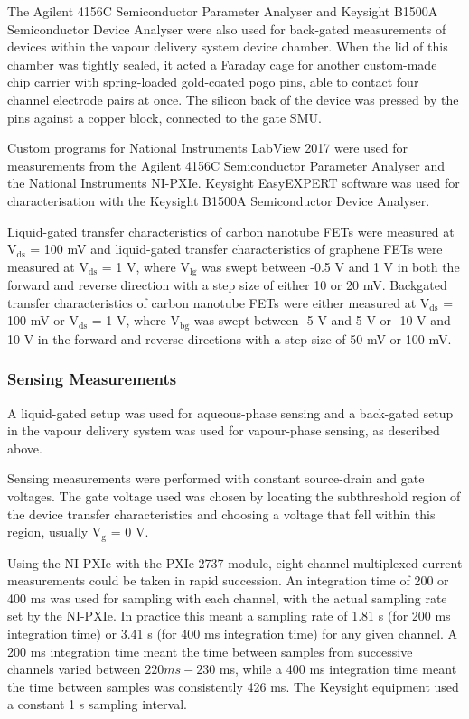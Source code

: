 \documentclass[
  letterpaper,
  DIV=11,
  numbers=noendperiod]{scrartcl}
\begin{document}
The Agilent 4156C Semiconductor Parameter Analyser and Keysight B1500A
Semiconductor Device Analyser were also used for back-gated measurements
of devices within the vapour delivery system device chamber. When the
lid of this chamber was tightly sealed, it acted a Faraday cage for
another custom-made chip carrier with spring-loaded gold-coated pogo
pins, able to contact four channel electrode pairs at once. The silicon
back of the device was pressed by the pins against a copper block,
connected to the gate SMU.

Custom programs for National Instruments LabView 2017 were used for
measurements from the Agilent 4156C Semiconductor Parameter Analyser and
the National Instruments NI-PXIe. Keysight EasyEXPERT software was used
for characterisation with the Keysight B1500A Semiconductor Device
Analyser.

Liquid-gated transfer characteristics of carbon nanotube FETs were
measured at V\(_{\mathrm{ds}}\) = 100 mV and liquid-gated transfer
characteristics of graphene FETs were measured at V\(_{\mathrm{ds}}\) =
1 V, where V\(_{\mathrm{lg}}\) was swept between -0.5 V and 1 V in both
the forward and reverse direction with a step size of either 10 or 20
mV. Backgated transfer characteristics of carbon nanotube FETs were
either measured at V\(_{\mathrm{ds}}\) = 100 mV or V\(_{\mathrm{ds}}\) =
1 V, where V\(_{\mathrm{bg}}\) was swept between -5 V and 5 V or -10 V
and 10 V in the forward and reverse directions with a step size of 50 mV
or 100 mV.

\hypertarget{sensing-measurements}{%
\subsubsection{Sensing Measurements}\label{sensing-measurements}}

A liquid-gated setup was used for aqueous-phase sensing and a back-gated
setup in the vapour delivery system was used for vapour-phase sensing,
as described above.

Sensing measurements were performed with constant source-drain and gate
voltages. The gate voltage used was chosen by locating the subthreshold
region of the device transfer characteristics and choosing a voltage
that fell within this region, usually V\(_{\mathrm{g}}\) = 0 V.

Using the NI-PXIe with the PXIe-2737 module, eight-channel multiplexed
current measurements could be taken in rapid succession. An integration
time of 200 or 400 ms was used for sampling with each channel, with the
actual sampling rate set by the NI-PXIe. In practice this meant a
sampling rate of 1.81 s (for 200 ms integration time) or 3.41 s (for 400
ms integration time) for any given channel. A 200 ms integration time
meant the time between samples from successive channels varied between
\(220 ms-230\) ms, while a 400 ms integration time meant the time
between samples was consistently 426 ms. The Keysight equipment used a
constant 1 s sampling interval.
\end{document}
